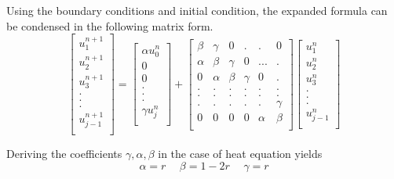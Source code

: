 \documentclass[12pt, oneside]{book}
\theoremstyle{plain}
\theoremstyle{definition}
\begin{document}
Using the boundary conditions and  initial condition, the expanded formula can be condensed in the following matrix form. 
$$
\begin{bmatrix} 
u_{1}^{n + 1} \\ 
u_{2}^{n + 1} \\ 
u_{3}^{n + 1} \\ 
.\\ 
.\\ 
.\\ 
u_{j - 1}^{n + 1}\\ 
\end{bmatrix} = \begin{bmatrix}
\alpha u_{0}^{n} \\ 
0 \\ 
0 \\ 
.\\ 
.\\ 
.\\ 
\gamma u_{j}^{n} \\ 
\end{bmatrix}  + \begin{bmatrix}  
\beta & \gamma & 0 & . & . & 0 \\ 
\alpha & \beta & \gamma & 0 & ... & . \\ 
0 & \alpha & \beta & \gamma & 0 & . \\ 
. & . & .  & . & . & . \\ 
. & . & .  & . & . & . \\ 
. & . & .  & . & . & \gamma \\ 
0 & 0 & 0 & 0 & \alpha & \beta \\ 
\end{bmatrix} \begin{bmatrix}  
u_{1}^{n} \\ 
u_{2}^{n} \\ 
u_{3}^{n} \\ 
.\\ 
.\\ 
.\\ 
u_{j - 1}^{n} \\ 
\end{bmatrix} 
$$

Deriving the coefficients   $\gamma,  \alpha, \beta$ in the case of heat equation yields
\begin{equation}
\alpha =  r \hspace{15pt} \beta = 1 - 2r \hspace{15pt} \gamma = r
\end{equation}
\end{document}
